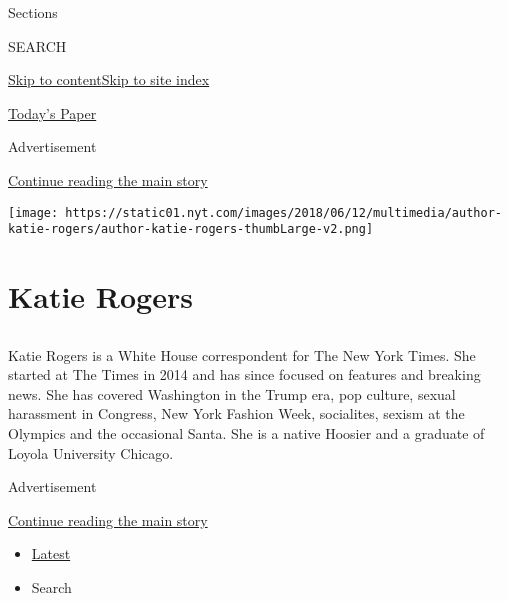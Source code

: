 Sections

SEARCH

\protect\hyperlink{site-content}{Skip to
content}\protect\hyperlink{site-index}{Skip to site index}

\href{https://myaccount.nytimes.com/auth/login?response_type=cookie\&client_id=vi}{}

\href{https://www.nytimes.com/section/todayspaper}{Today's Paper}

Advertisement

\protect\hyperlink{after-top}{Continue reading the main story}

\texttt{[image: https://static01.nyt.com/images/2018/06/12/multimedia/author-katie-rogers/author-katie-rogers-thumbLarge-v2.png]}

\hypertarget{katie-rogers}{%
\section{Katie Rogers}\label{katie-rogers}}

\subsection{}

Katie Rogers is a White House correspondent for The New York Times. She
started at The Times in 2014 and has since focused on features and
breaking news. She has covered Washington in the Trump era, pop culture,
sexual harassment in Congress, New York Fashion Week, socialites, sexism
at the Olympics and the occasional Santa. She is a native Hoosier and a
graduate of Loyola University Chicago.

Advertisement

\protect\hyperlink{after-mid1}{Continue reading the main story}

\begin{itemize}
\tightlist
\item
  \protect\hyperlink{stream-panel}{Latest}
\item
  Search
\end{itemize}


